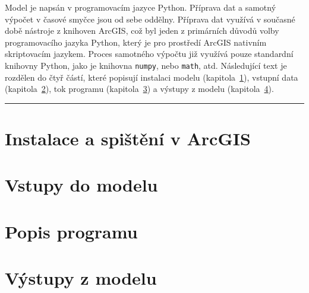 Model \smod je napsán v programovacím jazyce Python. Příprava dat a samotný výpočet v časové smyčce jsou od sebe oddělny. Příprava dat využívá v současné době nástroje z knihoven ArcGIS, což byl jeden z primárních důvodů volby  programovacího jazyka Python, který je pro prostředí ArcGIS nativním skriptovacím jazykem. Proces samotného výpočtu již využívá pouze standardní knihovny Python, jako je knihovna \texttt{numpy}, nebo \texttt{math}, atd. Následující text je rozdělen do čtyř částí, které popisují instalaci modelu (kapitola~\ref{kap:instalace}), vstupní data (kapitola~\ref{kap:vstupy}), tok programu (kapitola~\ref{kap:tok}) a výstupy z modelu (kapitola~\ref{kap:vystupy}). \\
% 
% 
\rule{\textwidth}{0.3pt}

%         


	\section{Instalace \smod a spištění v ArcGIS} \label{kap:instalace}
	 
	
	
	\section{Vstupy do modelu} \label{kap:vstupy}
	 
	
	\section{Popis programu} \label{kap:tok}
	
	
	\newpage
	\section{Výstupy z modelu} \label{kap:vystupy}
	

